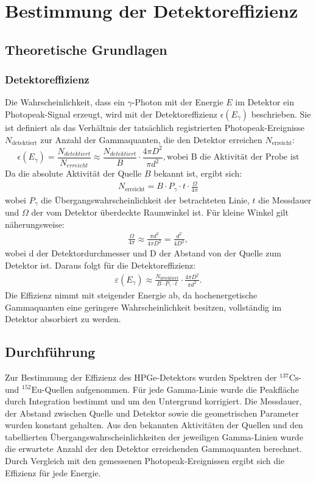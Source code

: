 \chapter{Bestimmung der Detektoreffizienz}
\section{Theoretische Grundlagen}
\subsection{Detektoreffizienz}
Die Wahrscheinlichkeit, dass ein $\gamma$-Photon mit der Energie $E$ im Detektor ein Photopeak-Signal erzeugt, wird mit der Detektoreffizienz $\epsilon(E_\gamma)$ beschrieben. Sie ist definiert als das
Verhältnis der tatsächlich registrierten Photopeak-Ereignisse $N_{\text{detektiert}}$
zur Anzahl der Gammaquanten, die den Detektor erreichen $N_{\text{erreicht}}$:
\begin{equation}
    \epsilon(E_\gamma)=\frac{N_{detektiert}}{N_{erreicht}}\approx\frac{N_{detektiert}}{B}\cdot\frac{4\pi D^2}{\pi d^2}, \text{wobei B die Aktivität der Probe ist}
\end{equation}
\label{eq_5}
Da die absolute Aktivität der Quelle $B$ bekannt ist, ergibt sich:
\begin{align*}
    N_{\text{erreicht}} = B \cdot P_\gamma \cdot t \cdot \frac{\Omega}{4\pi}
\end{align*}
wobei $P_\gamma$ die Übergangswahrscheinlichkeit der betrachteten Linie,
$t$ die Messdauer und $\Omega$ der vom Detektor überdeckte Raumwinkel ist.
Für kleine Winkel gilt näherungsweise:
\begin{align*}
    \frac{\Omega}{4\pi} \approx \frac{\pi d^2}{4\pi D^2} = \frac{d^2}{4D^2},
\end{align*}
wobei d der Detektordurchmesser und D der Abstand von der Quelle zum Detektor ist.
Daraus folgt für die Detektoreffizienz:
\begin{align*}
    \varepsilon(E_\gamma) \approx \frac{N_{\text{detektiert}}}{B \cdot P_\gamma \cdot t}\cdot \frac{4\pi D^2}{\pi d^2}.
\end{align*}
Die Effizienz nimmt mit steigender Energie ab, da hochenergetische Gammaquanten eine geringere Wahrscheinlichkeit besitzen, vollständig im Detektor absorbiert zu werden.

\section{Durchführung}
Zur Bestimmung der Effizienz des HPGe-Detektors wurden Spektren der $^{137}\mathrm{Cs}$- und $^{152}\mathrm{Eu}$-Quellen aufgenommen. Für jede Gamma-Linie wurde die Peakfläche durch Integration bestimmt und um den Untergrund korrigiert. Die Messdauer, der Abstand zwischen Quelle und Detektor sowie die geometrischen Parameter wurden konstant gehalten.
Aus den bekannten Aktivitäten der Quellen und den tabellierten Übergangswahrscheinlichkeiten der jeweiligen Gamma-Linien wurde die erwartete Anzahl der den Detektor erreichenden Gammaquanten berechnet. Durch Vergleich mit den gemessenen Photopeak-Ereignissen ergibt sich die Effizienz für jede Energie.

